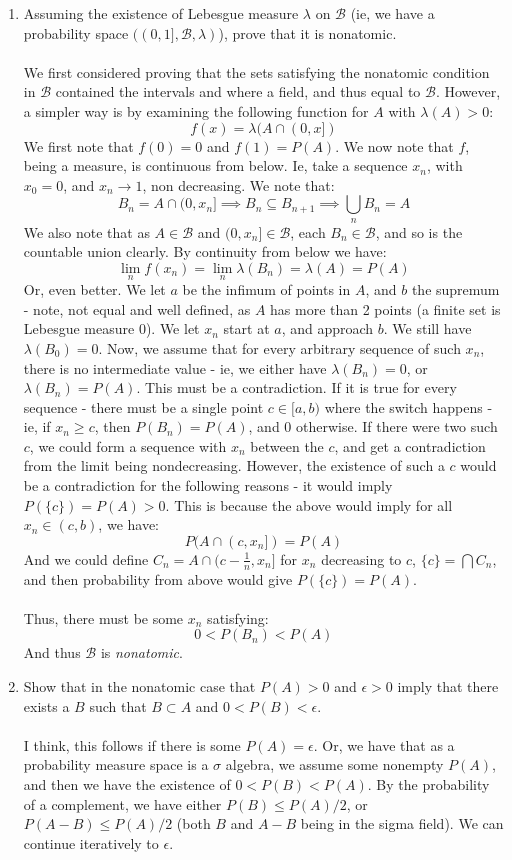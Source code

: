 \documentclass[12pt,a4paper]{article}
\newcommand{\1}[1]{\mathbbm{1}\left\{ #1 \right\}}
\newcommand{\bcal}{\mathcal{B}}
\begin{document}
\begin{enumerate}
	\item Assuming the existence of Lebesgue measure $\lambda$ on $\bcal$ (ie, we have a probability space $((0,1],\bcal,\lambda)$), prove that it is nonatomic.
	\\\\
	We first considered proving that the sets satisfying the nonatomic condition in $\bcal$ contained the intervals and where a field, and thus equal to $\bcal$. However, a simpler way is by examining the following function for $A$ with $\lambda(A) > 0$:
	$$
		f(x) = \lambda(A \cap (0,x])
	$$
	We first note that $f(0) = 0$ and $f(1) = P(A)$. We now note that $f$, being a measure, is continuous from below. Ie, take a sequence $x_n$, with $x_0 = 0$, and $x_n \to 1$, non decreasing. We note that:
	$$
		B_n = A \cap (0,x_n] \implies B_n \subseteq B_{n+1} \implies \bigcup_n B_n = A 
	$$
	We also note that as $A \in \bcal$ and $(0,x_n] \in \bcal$, each $B_n \in \bcal$, and so is the countable union clearly. By continuity from below we have:
	$$
		\lim_n f(x_n) = \lim_n \lambda(B_n) = \lambda(A) = P(A)
	$$
	Or, even better. We let $a$ be the infimum of points in $A$, and $b$ the supremum - note, not equal and well defined, as $A$ has more than 2 points (a finite set is Lebesgue measure $0$). We let $x_n$ start at $a$, and approach $b$. We still have $\lambda(B_0) = 0$. Now, we assume that for every arbitrary sequence of such $x_n$, there is no intermediate value - ie, we either have $\lambda(B_n) = 0$, or $\lambda(B_n) = P(A)$. This must be a contradiction. If it is true for every sequence - there must be a single point $c \in [a,b)$ where the switch happens - ie, if $x_n \geq c$, then $P(B_n) = P(A)$, and $0$ otherwise. If there were two such $c$, we could form a sequence with $x_n$ between the $c$, and get a contradiction from the limit being nondecreasing. However, the existence of such a $c$ would be a contradiction for the following reasons - it would imply $P(\{c\}) = P(A) > 0$. This is because the above would imply for all $x_n \in (c,b)$, we have:
	$$
		P(A \cap (c,x_n]) = P(A)
	$$
	And we could define $C_n = A \cap (c-\frac{1}{n},x_n]$ for $x_n$ decreasing to $c$, $\{c\} = \bigcap C_n$, and then probability from above would give $P(\{c\}) = P(A)$.
	\\\\
	Thus, there must be some $x_n$ satisfying:
	$$
		0 < P(B_n) < P(A)
	$$
	And thus $\bcal$ is \textit{nonatomic}.
	
	\item Show that in the nonatomic case that $P(A) > 0$ and $\epsilon > 0$ imply that there exists a $B$ such that $B \subset A$ and $0 < P(B) < \epsilon$.
	\\\\
	I think, this follows if there is some $P(A) = \epsilon$. Or, we have that as a probability measure space is a $\sigma$ algebra, we assume some nonempty $P(A)$, and then we have the existence of $0 < P(B) < P(A)$. By the probability of a complement, we have either $P(B) \leq P(A)/2$, or $P(A - B) \leq P(A)/2$ (both $B$ and $A - B$ being in the sigma field). We can continue iteratively to $\epsilon$.
	

\end{enumerate}
\end{document}
